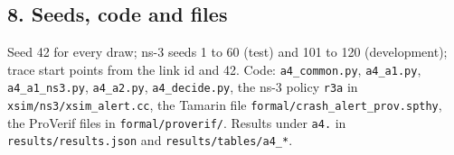 \subsection*{8. Seeds, code and files}

Seed 42 for every draw; ns-3 seeds 1 to 60 (test) and 101 to 120 (development); trace start points from the link id and 42. Code: \texttt{a4\_common.py}, \texttt{a4\_a1.py}, \texttt{a4\_a1\_ns3.py}, \texttt{a4\_a2.py}, \texttt{a4\_decide.py}, the ns-3 policy \texttt{r3a} in \texttt{xsim/ns3/xsim\_alert.cc}, the Tamarin file \texttt{formal/crash\_alert\_prov.spthy}, the ProVerif files in \texttt{formal/proverif/}. Results under \texttt{a4.} in \texttt{results/results.json} and \texttt{results/tables/a4\_*}.


